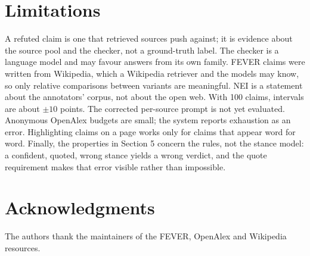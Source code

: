 \documentclass[11pt,a4paper]{article}
\begin{document}
\section*{Limitations}

A refuted claim is one that retrieved sources push against; it is evidence about the source pool and the checker, not a ground-truth label. The checker is a language model and may favour answers from its own family. FEVER claims were written from Wikipedia, which a Wikipedia retriever and the models may know, so only relative comparisons between variants are meaningful. NEI is a statement about the annotators' corpus, not about the open web. With 100 claims, intervals are about $\pm 10$ points. The corrected per-source prompt is not yet evaluated. Anonymous OpenAlex budgets are small; the system reports exhaustion as an error. Highlighting claims on a page works only for claims that appear word for word. Finally, the properties in Section 5 concern the rules, not the stance model: a confident, quoted, wrong stance yields a wrong verdict, and the quote requirement makes that error visible rather than impossible.

\section*{Acknowledgments}
The authors thank the maintainers of the FEVER, OpenAlex and Wikipedia resources.
\end{document}
